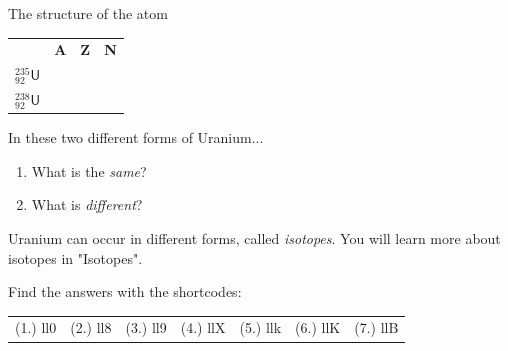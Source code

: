 \begin{exercises}{The structure of the atom}
\begin{enumerate}[noitemsep, label=\textbf{\arabic*}. ]
\begin{table}[H]
\begin{center}
\begin{xtabular}[t]{|l|l|l|l|}
         &
        \textbf{A} &
        \textbf{Z} &
        \textbf{N}%
     \tabularnewline{}
        $_{92}^{235}\mathsf{U}$ &
         &
         &
     \tabularnewline{}
        $_{92}^{238}\mathsf{U}$ &
         &
         &
     \tabularnewline{}
    \end{xtabular}
      \end{center}
\end{table}
    \par
In these two different forms of Uranium...
\label{m38745*id257277}\begin{enumerate}[noitemsep, label=\textbf{\alph*}. ] 
            \label{m38745*uid38}\item What is the \textsl{same}?
\label{m38745*uid39}\item What is \textsl{different}?
\end{enumerate}
Uranium can occur in different forms, called \textsl{isotopes}. You will learn more about isotopes in "Isotopes".\newline
\end{enumerate}
  \label{m38745**end}
\par {} Find the answers with the shortcodes:
 \par \begin{tabular}[h]{cccccc}
 (1.) ll0  &  (2.) ll8  &  (3.) ll9  &  (4.) llX  &  (5.) llk  &  (6.) llK  &  (7.) llB  & \end{tabular}
\end{exercises}
